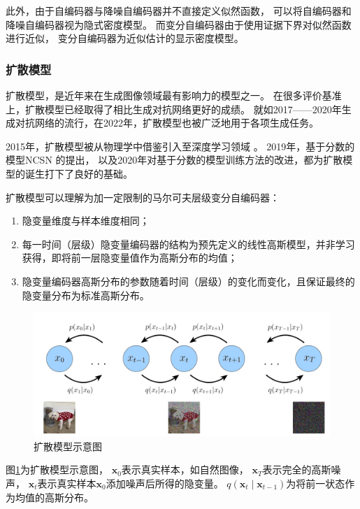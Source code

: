 此外，由于自编码器与降噪自编码器并不直接定义似然函数，
可以将自编码器和降噪自编码器视为隐式密度模型。
而变分自编码器由于使用证据下界对似然函数进行近似，
变分自编码器为近似估计的显示密度模型。



\subsubsection{扩散模型}
扩散模型，是近年来在生成图像领域最有影响力的模型之一。
在很多评价基准上，扩散模型已经取得了相比生成对抗网络更好的成绩。
就如2017——2020年生成对抗网络的流行，在2022年，扩散模型也被广泛地用于各项生成任务。

2015年，扩散模型被从物理学中借鉴引入至深度学习领域 {\cite{sohl2015deep}}。
2019年，基于分数的模型NCSN {\cite{song2019generative}}的提出，
以及2020年对基于分数的模型训练方法的改进，都为扩散模型的诞生打下了良好的基础。

扩散模型可以理解为加一定限制的马尔可夫层级变分自编码器：
\begin{enumerate}
    \item 隐变量维度与样本维度相同；
    \item 每一时间（层级）隐变量编码器的结构为预先定义的线性高斯模型，并非学习获得，即将前一层隐变量值作为高斯分布的均值；
    \item 隐变量编码器高斯分布的参数随着时间（层级）的变化而变化，且保证最终的隐变量分布为标准高斯分布。
\end{enumerate}
\begin{figure}[ht]
    \centering
    \includegraphics[width=\textwidth]{figures/diffusion_model}
    \caption{扩散模型示意图}\label{fig:diffusion_model}
\end{figure}

图{\ref{fig:diffusion_model}}为扩散模型示意图，
{$\bm{x}_{0}$}表示真实样本，如自然图像，
{$\bm{x}_{T}$}表示完全的高斯噪声，
{$\bm{x}_{t}$}表示真实样本{$\bm{x}_{0}$}添加噪声后所得的隐变量。
{$q(\bm{x}_{t}\mid \bm{x}_{t-1})$}为将前一状态作为均值的高斯分布。

